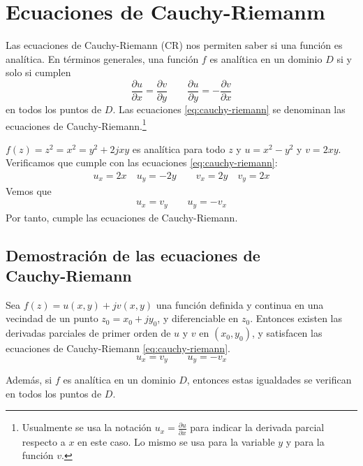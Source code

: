 \section{Ecuaciones de Cauchy-Riemanm}

Las ecuaciones de Cauchy-Riemann (CR) nos permiten saber si una función es analítica. En términos generales, una función $f$ es analítica en un dominio $D$ si y solo si cumplen
\begin{equation}
  \frac{\partial u}{\partial x} = \frac{\partial v}{\partial y} \qquad \frac{\partial u}{\partial y} = -\frac{\partial v}{\partial x}
  \label{eq:cauchy-riemann}
\end{equation}
en todos los puntos de $D$. Las ecuaciones \ref{eq:cauchy-riemann} se denominan las ecuaciones de Cauchy-Riemann.\footnote{Usualmente se usa la notación $u_x=\frac{\partial u}{\partial x}$ para indicar la derivada parcial respecto a $x$ en este caso. Lo mismo se usa para la variable $y$ y para la función $v$.}

\begin{example}
  $f(z)=z^2=x^2=y^2+2jxy$ es analítica para todo $z$ y $u=x^2-y^2$ y $v=2xy$. Verificamos que cumple con las ecuaciones \ref{eq:cauchy-riemann}:
  \begin{gather*}
    u_x = 2x \quad u_y = -2y \qquad v_x = 2y \quad v_y = 2x
  \end{gather*}
  Vemos que
  \begin{align*}
    u_x = v_y \qquad u_y = -v_x
  \end{align*}
  Por tanto, cumple las ecuaciones de Cauchy-Riemann.
\end{example}

\subsection[Demostración de las ecuaciones de Cauchy-Riemann]{Demostración de las ecuaciones de\\Cauchy-Riemann}

\begin{theorem}\label{teo:ecuaciones_de_cr}
Sea $f(z) = u(x, y) + jv(x, y)$ una función definida y continua en una vecindad de un punto $z_0 = x_0 + jy_0$, y diferenciable en $z_0$.  
Entonces existen las derivadas parciales de primer orden de $u$ y $v$ en $(x_0, y_0)$, y satisfacen las ecuaciones de Cauchy-Riemann \ref{eq:cauchy-riemann}.
\begin{equation*}
  u_x=v_y \qquad u_y=-v_x
\end{equation*}

Además, si $f$ es analítica en un dominio $D$, entonces estas igualdades se verifican en todos los puntos de $D$.
\end{theorem}

